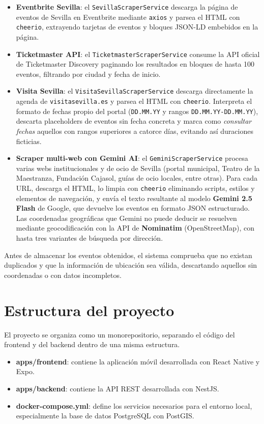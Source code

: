 \begin{itemize}
    \item \textbf{Eventbrite Sevilla}: el \texttt{SevillaScraperService} descarga la página de eventos de Sevilla en Eventbrite mediante \texttt{axios} y parsea el HTML con \texttt{cheerio}, extrayendo tarjetas de eventos y bloques JSON-LD embebidos en la página.
    \item \textbf{Ticketmaster API}: el \texttt{TicketmasterScraperService} consume la API oficial de Ticketmaster Discovery paginando los resultados en bloques de hasta 100 eventos, filtrando por ciudad y fecha de inicio.
    \item \textbf{Visita Sevilla}: el \texttt{VisitaSevillaScraperService} descarga directamente la agenda de \texttt{visitasevilla.es} y parsea el HTML con \texttt{cheerio}. Interpreta el formato de fechas propio del portal (\texttt{DD.MM.YY} y rangos \texttt{DD.MM.YY-DD.MM.YY}), descarta placeholders de eventos sin fecha concreta y marca como \textit{consultar fechas} aquellos con rangos superiores a catorce días, evitando así duraciones ficticias.
    \item \textbf{Scraper multi-web con Gemini AI}: el \texttt{GeminiScraperService} procesa varias webs institucionales y de ocio de Sevilla (portal municipal, Teatro de la Maestranza, Fundación Cajasol, guías de ocio locales, entre otras). Para cada URL, descarga el HTML, lo limpia con \texttt{cheerio} eliminando scripts, estilos y elementos de navegación, y envía el texto resultante al modelo \textbf{Gemini 2.5 Flash} de Google, que devuelve los eventos en formato JSON estructurado. Las coordenadas geográficas que Gemini no puede deducir se resuelven mediante geocodificación con la API de \textbf{Nominatim} (OpenStreetMap), con hasta tres variantes de búsqueda por dirección.
\end{itemize}

Antes de almacenar los eventos obtenidos, el sistema comprueba que no existan duplicados y que la información de ubicación sea válida, descartando aquellos sin coordenadas o con datos incompletos.

\section{Estructura del proyecto}

El proyecto se organiza como un monorepositorio, separando el código del frontend y del backend dentro de una misma estructura.

\begin{itemize}
    \item \textbf{apps/frontend}: contiene la aplicación móvil desarrollada con React Native y Expo.
    \item \textbf{apps/backend}: contiene la API REST desarrollada con NestJS.
    \item \textbf{docker-compose.yml}: define los servicios necesarios para el entorno local, especialmente la base de datos PostgreSQL con PostGIS.
\end{itemize}

